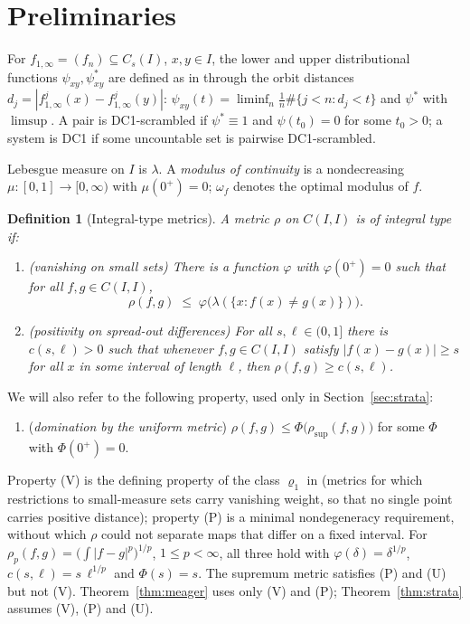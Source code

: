 ﻿\documentclass[11pt]{article}
\newtheorem{definition}[theorem]{Definition}
\newcommand{\I}{I}
\newcommand{\Cs}{C_s(\I)}
\newcommand{\CI}{C(\I,\I)}
\newcommand{\rsup}{\rho_{\sup}}
\begin{document}
\section{Preliminaries}\label{sec:prelim}

For $f_{1,\infty}=(f_n)\subseteq\Cs$, $x,y\in\I$, the lower and upper
distributional functions $\psi_{xy},\psi^*_{xy}$ are defined as in
\cite{BR,companion} through the orbit distances
$d_j=|f^j_{1,\infty}(x)-f^j_{1,\infty}(y)|$:
$\psi_{xy}(t)=\liminf_n\frac1n\#\{j<n:d_j<t\}$ and $\psi^*$ with $\limsup$.  A pair
is DC1-scrambled if $\psi^*\equiv1$ and $\psi(t_0)=0$ for some $t_0>0$; a system is
DC1 if some uncountable set is pairwise DC1-scrambled.

Lebesgue measure on $\I$ is $\lambda$.  A \emph{modulus of continuity} is a
nondecreasing $\mu:[0,1]\to[0,\infty)$ with $\mu(0^+)=0$; $\omega_f$ denotes the
optimal modulus of $f$.

\begin{definition}[Integral-type metrics]\label{def:integral}
A metric $\rho$ on $\CI$ is of \emph{integral type} if:
\begin{enumerate}
\item[(V)] (\emph{vanishing on small sets})  There is a function $\varphi$ with
$\varphi(0^+)=0$ such that for all $f,g\in\CI$,
\[
\rho(f,g)\;\le\;\varphi\bigl(\lambda(\{x:f(x)\ne g(x)\})\bigr).
\]
\item[(P)] (\emph{positivity on spread-out differences})  For all $s,\ell\in(0,1]$
there is $c(s,\ell)>0$ such that whenever $f,g\in\CI$ satisfy
$|f(x)-g(x)|\ge s$ for all $x$ in some interval of length $\ell$, then
$\rho(f,g)\ge c(s,\ell)$.
\end{enumerate}
\end{definition}

We will also refer to the following property, used only in
Section~\ref{sec:strata}:
\begin{enumerate}
\item[(U)] (\emph{domination by the uniform metric})
$\rho(f,g)\le\Phi\bigl(\rsup(f,g)\bigr)$ for some $\Phi$ with $\Phi(0^+)=0$.
\end{enumerate}
Property (V) is the defining property of the class $\varrho_1$ in
\cite[Remark 1]{BR} (metrics for which restrictions to small-measure sets carry
vanishing weight, so that no single point carries positive distance); property (P)
is a minimal nondegeneracy requirement, without which $\rho$ could not separate
maps that differ on a fixed interval.  For $\rho_p(f,g)=\bigl(\int|f-g|^p\bigr)^{1/p}$,
$1\le p<\infty$, all three hold with $\varphi(\delta)=\delta^{1/p}$,
$c(s,\ell)=s\,\ell^{1/p}$ and $\Phi(s)=s$.  The supremum metric satisfies (P) and
(U) but not (V).  Theorem~\ref{thm:meager} uses only (V) and (P);
Theorem~\ref{thm:strata} assumes (V), (P) and (U).
\end{document}
